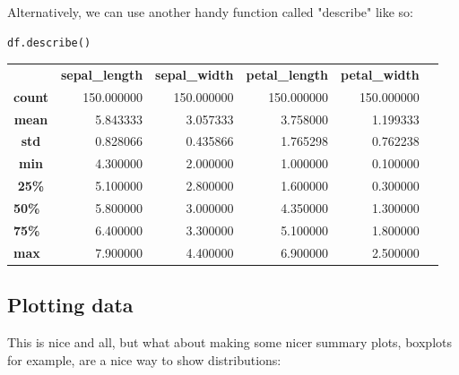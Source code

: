 \documentclass[12pt]{article}
\begin{document}
Alternatively, we can use another handy function called "describe" like so:

\begin{lstlisting}[language=Python]
    df.describe()
\end{lstlisting}

\begin{table}[!h]
    \centering
    \begin{tabular}{crrrrr}
    \multicolumn{1}{r}{\textbf{}}      & \textbf{sepal\_length} & \textbf{sepal\_width} & \textbf{petal\_length} & \textbf{petal\_width} & \textbf{}            \\
    \multicolumn{1}{r}{\textbf{count}} & 150.000000             & 150.000000            & 150.000000             & 150.000000            &                      \\
    \textbf{mean}                      & 5.843333               & 3.057333              & 3.758000               & 1.199333              &                      \\
    \textbf{std}                       & 0.828066               & 0.435866              & 1.765298               & 0.762238              &                      \\
    \textbf{min}                       & 4.300000               & 2.000000              & 1.000000               & 0.100000              &                      \\
    \textbf{25\%}                      & 5.100000               & 2.800000              & 1.600000               & 0.300000              &                      \\
    \multicolumn{1}{l}{\textbf{50\%}}  & 5.800000               & 3.000000              & 4.350000               & 1.300000              & \multicolumn{1}{l}{} \\
    \multicolumn{1}{l}{\textbf{75\%}}  & 6.400000               & 3.300000              & 5.100000               & 1.800000              & \multicolumn{1}{l}{} \\
    \multicolumn{1}{l}{\textbf{max}}   & 7.900000               & 4.400000              & 6.900000               & 2.500000              & \multicolumn{1}{l}{}
    \end{tabular}
    \end{table}

\subsection{Plotting data}
This is nice and all, but what about making some nicer summary plots, boxplots for example, are a nice way to show distributions:
\end{document}

